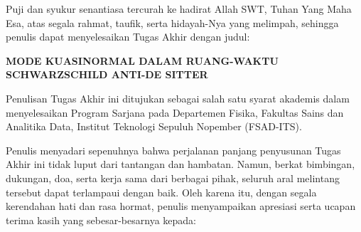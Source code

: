 \noindent Puji dan syukur senantiasa tercurah ke hadirat Allah SWT, Tuhan Yang Maha Esa, atas segala rahmat, taufik, serta hidayah-Nya yang melimpah, sehingga penulis dapat menyelesaikan Tugas Akhir dengan judul:

\vspace{8pt}

\begin{center}
    \textbf{\large MODE KUASINORMAL DALAM RUANG-WAKTU SCHWARZSCHILD ANTI-DE SITTER}
\end{center}

\vspace{8pt}

\noindent Penulisan Tugas Akhir ini ditujukan sebagai salah satu syarat akademis dalam menyelesaikan Program Sarjana pada Departemen Fisika, Fakultas Sains dan Analitika Data, Institut Teknologi Sepuluh Nopember (FSAD-ITS). 

Penulis menyadari sepenuhnya bahwa perjalanan panjang penyusunan Tugas Akhir ini tidak luput dari tantangan dan hambatan. Namun, berkat bimbingan, dukungan, doa, serta kerja sama dari berbagai pihak, seluruh aral melintang tersebut dapat terlampaui dengan baik. Oleh karena itu, dengan segala kerendahan hati dan rasa hormat, penulis menyampaikan apresiasi serta ucapan terima kasih yang sebesar-besarnya kepada:


